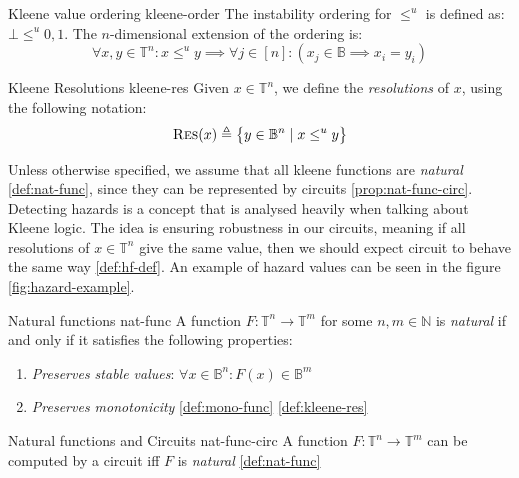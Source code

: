 \begin{definitionbox}{Kleene value ordering \cite{mukaidono_BternaryLogicFunction_1972}}{kleene-order}
    The instability ordering for $\leq^u$ is defined as: $\bot \leq^u 0,1$. The $n$-dimensional
    extension of the ordering is:
    $$
    \forall x,y \in \mathbb{T}^n: x \leq^u y \implies \forall j \in [n]: (x_j \in \mathbb{B} \implies x_i = y_i)
    $$
\end{definitionbox}


\begin{definitionbox}{Kleene Resolutions \cite{mukaidono_BternaryLogicFunction_1972, ikenmeyer_ComplexityHazardfreeCircuits_2019}}{kleene-res}
    Given $x \in \mathbb{T}^n$, we define the \textit{resolutions} of $x$, using the following notation:
    $$
    \textnormal{\textsc{Res}}(x) \triangleq \big\{ y \in \mathbb{B}^n \mid x \leq^u y  \big\}
    $$
\end{definitionbox}

Unless otherwise specified, we assume that all kleene functions are \textit{natural} \ref{def:nat-func}, since
they can be represented by circuits \ref{prop:nat-func-circ}.
Detecting hazards is a concept that is analysed heavily when talking about Kleene logic.
The idea is ensuring robustness in our circuits, meaning if all resolutions of $x \in \mathbb{T}^n$
give the same value, then we should expect circuit to behave the same way \ref{def:hf-def}.
An example of hazard values can be seen in the figure \ref{fig:hazard-example}.


\begin{definitionbox}{Natural functions \cite{ikenmeyer_ComplexityHazardfreeCircuits_2019}}{nat-func}
    A function $F: \mathbb{T}^n \to \mathbb{T}^m$ for some $n, m \in \mathbb{N}$ is \textit{natural} if and only
    if it satisfies the following properties:
    \begin{enumerate}
        \item \textit{Preserves stable values}: $\forall x \in \mathbb{B}^n: F(x) \in \mathbb{B}^m$ 
    \item \textit{Preserves monotonicity} \ref{def:mono-func} \ref{def:kleene-res}
    \end{enumerate}
\end{definitionbox}

\begin{propositionbox}{Natural functions and Circuits \cite{mukaidono_BternaryLogicFunction_1972,ikenmeyer_ComplexityHazardfreeCircuits_2019}}{nat-func-circ}
    A function $F: \mathbb{T}^n \to \mathbb{T}^m$ can be computed by a circuit iff $F$ is \textit{natural} \ref{def:nat-func}
\end{propositionbox}

